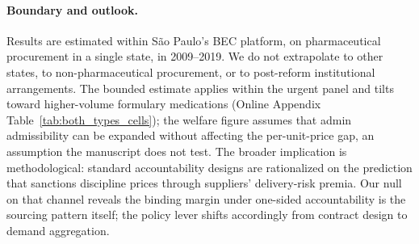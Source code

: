 \paragraph{Boundary and outlook.}
Results are estimated within S\~ao Paulo's BEC platform, on
pharmaceutical procurement in a single state, in 2009--2019. We do
not extrapolate to other states, to non-pharmaceutical procurement,
or to post-reform institutional arrangements. The bounded estimate
applies within the urgent panel and tilts toward higher-volume
formulary medications (Online Appendix
Table~\ref{tab:both_types_cells}); the welfare figure assumes that
admin admissibility can be expanded without affecting the
per-unit-price gap, an assumption the manuscript does not test. The
broader implication is methodological: standard accountability
designs are rationalized on the prediction that sanctions discipline
prices through suppliers' delivery-risk premia. Our null on that
channel reveals the binding margin under one-sided accountability
is the sourcing pattern itself; the policy lever shifts accordingly
from contract design to demand aggregation.
